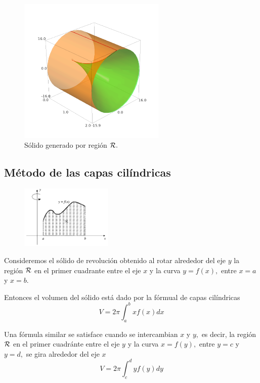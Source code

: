 \begin{figure}
 \centering
 \includegraphics[height=7cm]{./calculo/sage0504.png}
 \caption{S\'olido generado por regi\'on $\mathcal{R}.$}
 \label{fig:sage:0504}
\end{figure}



\subsection{M\'etodo de las capas cil\'indricas}


\begin{figure}
 \centering
 \includegraphics[height=3cm,keepaspectratio=true]{./calculo/fig3007.png}
 \label{fig:3007}
\end{figure}

Consideremos el s\'olido de revoluci\'on obtenido al rotar alrededor del eje $y$ la regi\'on $\mathcal{R}$ en el primer cuadrante entre el eje $x$ y la curva $y=f(x),$ entre $x=a$ y $x=b.$ 

Entonces el volumen del s\'olido está dado por la f\'ormual de capas cil\'indricas
\[
 \label{FCC}
 \tag{FCC}
 V=2\pi \int_{a}^{b}xf(x)dx
\]




Una f\'ormula similar se satisface cuando se intercambian $x$ y $y,$ es decir, la regi\'on $\mathcal{R}$ en el primer cuadránte entre el eje $y$ y la curva $x=f(y),$ entre $y=c$ y $y=d,$ se gira alrededor del eje $x$
\[
 \label{FCC:2}
 \tag{FCC(II)}
 V=2\pi \int_{c}^{d}yf(y)dy
\]



